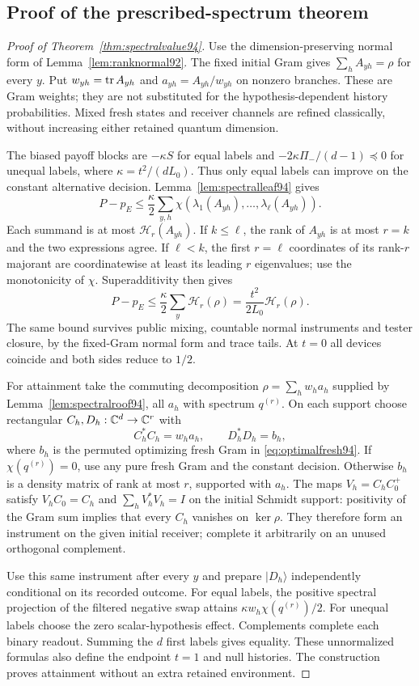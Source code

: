 \subsection{Proof of the prescribed-spectrum theorem}
\begin{proof}[Proof of Theorem~\ref{thm:spectralvalue94}]
Use the dimension-preserving normal form of
Lemma~\ref{lem:ranknormal92}.  The fixed initial Gram gives
$\sum_hA_{yh}=\rho$ for every $y$.  Put $w_{yh}=\operatorname{tr} A_{yh}$ and
$a_{yh}=A_{yh}/w_{yh}$ on nonzero branches.  These are Gram weights;
they are not substituted for the hypothesis-dependent history
probabilities.  Mixed fresh states and receiver channels are refined
classically, without increasing either retained quantum dimension.

The biased payoff blocks are $-\kappa S$ for equal labels and
$-2\kappa\Pi_-/(d-1)\preceq0$ for unequal labels, where
$\kappa=t^2/(dL_0)$.  Thus only equal labels can improve on the
constant alternative decision.  Lemma~\ref{lem:spectralleaf94} gives
\[
 P-p_E\le\frac{\kappa}{2}\sum_{y,h}
                  \chi(\lambda_1(A_{yh}),\ldots,\lambda_\ell(A_{yh})).
\]
Each summand is at most $\mathcal H_r(A_{yh})$.  If $k\le\ell$, the
rank of $A_{yh}$ is at most $r=k$ and the two expressions agree.  If
$\ell<k$, the first $r=\ell$ coordinates of its rank-$r$ majorant
are coordinatewise at least its leading $r$ eigenvalues; use the
monotonicity of $\chi$.  Superadditivity then gives
\[
 P-p_E\le\frac{\kappa}{2}\sum_y\mathcal H_r(\rho)
                    =\frac{t^2}{2L_0}\mathcal H_r(\rho).
\]
The same bound survives public mixing, countable normal instruments
and tester closure, by the fixed-Gram normal form and trace tails.
At $t=0$ all devices coincide and both sides reduce to $1/2$.

For attainment take the commuting decomposition
$\rho=\sum_hw_ha_h$ supplied by Lemma~\ref{lem:spectralroof94}, all
$a_h$ with spectrum $q^{(r)}$.  On each support choose rectangular
$C_h,D_h:\mathbb C^d\to\mathbb C^r$ with
\[
 C_h^*C_h=w_ha_h,\qquad D_h^*D_h=b_h,
\]
where $b_h$ is the permuted optimizing fresh Gram in
\eqref{eq:optimalfresh94}.  If $\chi(q^{(r)})=0$, use any pure
fresh Gram and the constant decision.  Otherwise $b_h$ is a density
matrix of rank at most $r$, supported with $a_h$.  The maps
$V_h=C_hC_0^+$ satisfy $V_hC_0=C_h$ and
$\sum_hV_h^*V_h=I$ on the initial Schmidt support: positivity of the
Gram sum implies that every $C_h$ vanishes on $\ker\rho$.
They therefore form an instrument on the given initial receiver;
complete it arbitrarily on an unused orthogonal complement.

Use this same instrument after every $y$ and prepare $|D_h\rangle$
independently conditional on its recorded outcome.  For equal labels,
the positive spectral projection of the filtered negative swap attains
$\kappa w_h\chi(q^{(r)})/2$.  For unequal labels choose the zero
scalar-hypothesis effect.  Complements complete each binary readout.
Summing the $d$ first labels gives equality.  These unnormalized
formulas also define the endpoint $t=1$ and null histories.  The
construction proves attainment without an extra retained environment.
\end{proof}

